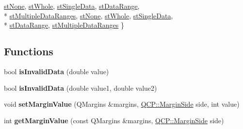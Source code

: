 \begin{DoxyCompactItemize}
\hyperlink{namespace_q_c_p_ac6cb9db26a564b27feda362a438db038a2cb7996ccc6c39b9e6d20f2e46bf3f57}{st\+None}, 
\hyperlink{namespace_q_c_p_ac6cb9db26a564b27feda362a438db038a70734549f1745196a5b3ae8b8d158d52}{st\+Whole}, 
\hyperlink{namespace_q_c_p_ac6cb9db26a564b27feda362a438db038a83873962d48d31fa01ac36f859c00f67}{st\+Single\+Data}, 
\hyperlink{namespace_q_c_p_ac6cb9db26a564b27feda362a438db038a1db42782cc5852ace37e61244df1b7ad}{st\+Data\+Range}, 
\\*
\hyperlink{namespace_q_c_p_ac6cb9db26a564b27feda362a438db038ab68af6f04366b667f30f3bf1276eaf4f}{st\+Multiple\+Data\+Ranges}, 
\hyperlink{namespace_q_c_p_ac6cb9db26a564b27feda362a438db038a2cb7996ccc6c39b9e6d20f2e46bf3f57}{st\+None}, 
\hyperlink{namespace_q_c_p_ac6cb9db26a564b27feda362a438db038a70734549f1745196a5b3ae8b8d158d52}{st\+Whole}, 
\hyperlink{namespace_q_c_p_ac6cb9db26a564b27feda362a438db038a83873962d48d31fa01ac36f859c00f67}{st\+Single\+Data}, 
\\*
\hyperlink{namespace_q_c_p_ac6cb9db26a564b27feda362a438db038a1db42782cc5852ace37e61244df1b7ad}{st\+Data\+Range}, 
\hyperlink{namespace_q_c_p_ac6cb9db26a564b27feda362a438db038ab68af6f04366b667f30f3bf1276eaf4f}{st\+Multiple\+Data\+Ranges}
 \}
\end{DoxyCompactItemize}
\subsection*{Functions}
\begin{DoxyCompactItemize}
\item 
bool {\bfseries is\+Invalid\+Data} (double value)\hypertarget{namespace_q_c_p_a07ab701c05329089f933b9cae2638a63}{}\label{namespace_q_c_p_a07ab701c05329089f933b9cae2638a63}

\item 
bool {\bfseries is\+Invalid\+Data} (double value1, double value2)\hypertarget{namespace_q_c_p_a728903e5c3dd17847bee280f4005496f}{}\label{namespace_q_c_p_a728903e5c3dd17847bee280f4005496f}

\item 
void {\bfseries set\+Margin\+Value} (Q\+Margins \&margins, \hyperlink{namespace_q_c_p_a7e487e3e2ccb62ab7771065bab7cae54}{Q\+C\+P\+::\+Margin\+Side} side, int value)\hypertarget{namespace_q_c_p_afbf6e3084c108f2bb4372107945ee82f}{}\label{namespace_q_c_p_afbf6e3084c108f2bb4372107945ee82f}

\item 
int {\bfseries get\+Margin\+Value} (const Q\+Margins \&margins, \hyperlink{namespace_q_c_p_a7e487e3e2ccb62ab7771065bab7cae54}{Q\+C\+P\+::\+Margin\+Side} side)\hypertarget{namespace_q_c_p_a23a2679d3495c444acc26acc61e35b5b}{}\label{namespace_q_c_p_a23a2679d3495c444acc26acc61e35b5b}

\end{DoxyCompactItemize}
